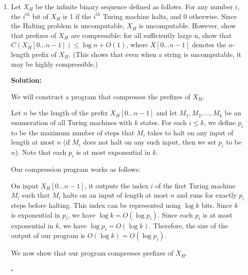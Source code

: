 \documentclass[10pt]{article}
\newenvironment{solution}{\textbf{Solution:}}{\hfill$\square$}
\begin{document}
\begin{enumerate}
\begin{solution}
    The length of this program (say $d$) is $d \leq c + O(\log(k)) + O(1)$, where $c$ is the plain Kolmogorov complexity of $x$. With a parallel argument, it's  easy to see $c \leq d + \log(n-k) + O(1)$ where $d$ is the plain Kolmogorov complexity of $y$. Therefore, we have shown that given any rotation $y$ of $x$, we can construct a program($d$) of length at most $d = c + O(1)$ bits that outputs $y$ (and vice versa), which implies that all rotations of $x$ have the same plain Kolmogorov complexity as $x$.
        
    \end{solution}
    \newpage

    \item Let $X_H$ be the infinite binary sequence defined as follows. For any number $i$, the $i^{th}$ bit of $X_H$ is 1 if the $i^{th}$ Turing machine halts, and 0 otherwise. Since the Halting problem is uncomputable, $X_H$ is uncomputable. However, show that prefixes of $X_H$ are compressible: for all sufficiently large n, show that $C(X_H[0 \ldots n - 1]) \leq \log n + O(1)$, where $X[0 . . . n - 1]$ denotes the $n$-length prefix of $X_H$. (This shows that even when a string is uncomputable, it may be highly compressible.)

    \begin{solution}

    We will construct a program that compresses the prefixes of $X_H$.
    
    Let $n$ be the length of the prefix $X_H[0 \ldots n - 1]$ and let $M_1, M_2, \ldots, M_k$ be an enumeration of all Turing machines with $k$ states. For each $i \leq k$, we define $p_i$ to be the maximum number of steps that $M_i$ takes to halt on any input of length at most $n$ (if $M_i$ does not halt on any such input, then we set $p_i$ to be $n$). Note that each $p_i$ is at most exponential in $k$.
    
    Our compression program works as follows:
    
    On input $X_H[0 \ldots n - 1]$, it outputs the index $i$ of the first Turing machine $M_i$ such that $M_i$ halts on an input of length at most $n$ and runs for exactly $p_i$ steps before halting. This index can be represented using $\log k$ bits. Since $k$ is exponential in $p_i$, we have $\log k = O(\log p_i)$. Since each $p_i$ is at most exponential in $k$, we have $\log p_i = O(\log k)$. Therefore, the size of the output of our program is $O(\log k) = O(\log p_i)$.
    
    We now show that our program compresses prefixes of $X_H$.
    

\end{solution}
\end{enumerate}
\end{document}
